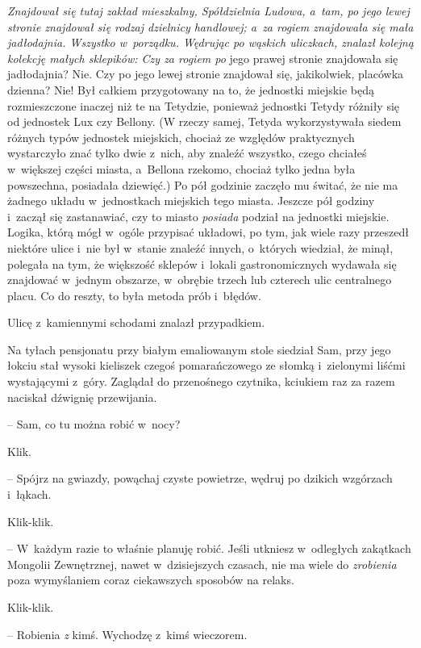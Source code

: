 \documentclass[oneside,polish,11pt,rmheadings]{mwbk}
\begin{document}
\textit{Znajdował się tutaj zakład mieszkalny, Spółdzielnia Ludowa, a~tam, po jego lewej stronie znajdował się rodzaj dzielnicy handlowej; a~za rogiem znajdowała się mała }\textit{jadłodajnia. Wszystko w~porządku. Wędrując po wąskich uliczkach, znalazł kolejną kolekcję małych sklepików: Czy za rogiem po }jego prawej stronie znajdowała się jadłodajnia? Nie. Czy po jego lewej stronie znajdował się, jakikolwiek, placówka dzienna? Nie! Był całkiem przygotowany na to, że jednostki miejskie będą rozmieszczone inaczej niż te na Tetydzie, ponieważ jednostki Tetydy różniły się od jednostek Lux czy Bellony. (W rzeczy samej, Tetyda wykorzystywała siedem różnych typów jednostek miejskich, chociaż ze względów praktycznych wystarczyło znać tylko dwie z~nich, aby znaleźć wszystko, czego chciałeś w~większej części miasta, a~Bellona rzekomo, chociaż tylko jedna była powszechna, posiadała dziewięć.) Po pół godzinie zaczęło mu świtać, że nie ma żadnego układu w~jednostkach miejskich tego miasta. Jeszcze pół godziny i~zaczął się zastanawiać, czy to miasto \textit{posiada }podział na jednostki miejskie. Logika, którą mógł w~ogóle przypisać układowi, po tym, jak wiele razy przeszedł niektóre ulice i~nie był w~stanie znaleźć innych, o~których wiedział, że minął, polegała na tym, że większość sklepów i~lokali gastronomicznych wydawała się znajdować w~jednym obszarze, w~obrębie trzech lub czterech ulic centralnego placu. Co do reszty, to była metoda prób i~błędów. 

Ulicę z~kamiennymi schodami znalazł przypadkiem. 

Na tyłach pensjonatu przy białym emaliowanym stole siedział Sam, przy jego łokciu stał wysoki kieliszek czegoś pomarańczowego ze słomką i~zielonymi liśćmi wystającymi z~góry. Zaglądał do przenośnego czytnika, kciukiem raz za razem naciskał dźwignię przewijania. 

-- Sam, co tu można robić w~nocy? 

Klik. 

-- Spójrz na gwiazdy, powąchaj czyste powietrze, wędruj po dzikich wzgórzach i~łąkach. 

 Klik-klik. 

-- W~każdym razie to właśnie planuję robić. Jeśli utkniesz w~odległych zakątkach Mongolii Zewnętrznej, nawet w~dzisiejszych czasach, nie ma wiele do \textit{zrobienia }poza wymyślaniem coraz ciekawszych sposobów na relaks. 

Klik-klik. 

-- Robienia \textit{z} kimś. Wychodzę z~kimś wieczorem. 
\end{document}
